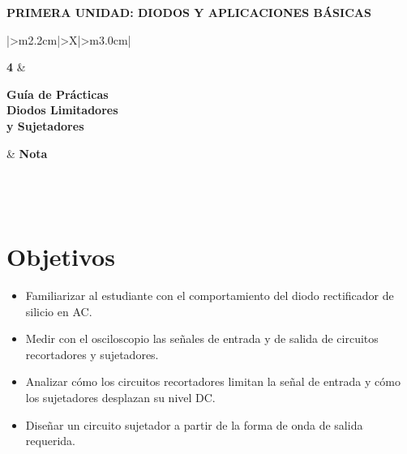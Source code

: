\documentclass[11pt,a4paper]{article}
\begin{document}
\begin{center}
    {\normalsize\bfseries PRIMERA UNIDAD: DIODOS Y APLICACIONES BÁSICAS}
\end{center}

\vspace{0.55cm}

\begingroup
\renewcommand{\tabularxcolumn}[1]{m{#1}}
\renewcommand{\arraystretch}{2.0}
\setlength{\tabcolsep}{12pt}
\noindent
\begin{tabularx}{\textwidth}{|>{\centering\arraybackslash}m{2.2cm}|>{\centering\arraybackslash}X|>{\centering\arraybackslash}m{3.0cm}|}
\hline
\rule{0pt}{2.1cm}{\fontsize{58}{58}\selectfont\bfseries 4}
    & \begin{minipage}[c]{\linewidth}\centering
          {\large\bfseries Guía de Prácticas}\\[7pt]
          {\Large\bfseries Diodos Limitadores\\ y Sujetadores}
      \end{minipage}
    & {\Large\bfseries Nota}\\
\hline
{}\\
\hline
{}\\
\\
\hline
\end{tabularx}
\endgroup

\vspace{0.8cm}

\section{Objetivos}
\begin{itemize}
    \item Familiarizar al estudiante con el comportamiento del diodo rectificador de
          silicio en AC.
    \item Medir con el osciloscopio las señales de entrada y de salida de circuitos
          recortadores y sujetadores.
    \item Analizar cómo los circuitos recortadores limitan la señal de entrada y cómo los
          sujetadores desplazan su nivel DC.
    \item Diseñar un circuito sujetador a partir de la forma de onda de salida requerida.
\end{itemize}
\end{document}

